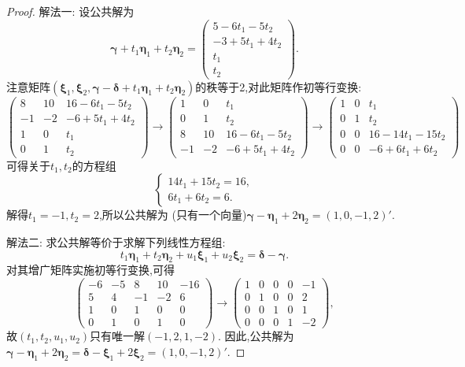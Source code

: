 \documentclass[../../main.tex]{subfiles}
\begin{document}
\begin{proof}
{\color{blue}解法一:} 设公共解为
\[
\boldsymbol{\gamma}+t_1\boldsymbol{\eta}_1 + t_2\boldsymbol{\eta}_2=\begin{pmatrix}
5 - 6t_1 - 5t_2\\
-3 + 5t_1 + 4t_2\\
t_1\\
t_2
\end{pmatrix}.
\]
注意矩阵\((\boldsymbol{\xi}_1,\boldsymbol{\xi}_2,\boldsymbol{\gamma}-\boldsymbol{\delta}+t_1\boldsymbol{\eta}_1 + t_2\boldsymbol{\eta}_2)\)的秩等于2,对此矩阵作初等行变换:
\[
\begin{pmatrix}
8&10&16 - 6t_1 - 5t_2\\
-1&-2&-6 + 5t_1 + 4t_2\\
1&0&t_1\\
0&1&t_2
\end{pmatrix}\to\begin{pmatrix}
1&0&t_1\\
0&1&t_2\\
8&10&16 - 6t_1 - 5t_2\\
-1&-2&-6 + 5t_1 + 4t_2
\end{pmatrix}\to
\begin{pmatrix}
1&0&t_1\\
0&1&t_2\\
0&0&16 - 14t_1 - 15t_2\\
0&0&-6 + 6t_1 + 6t_2
\end{pmatrix}
\]
可得关于\(t_1,t_2\)的方程组
\[
\begin{cases}
14t_1 + 15t_2 = 16,\\
6t_1 + 6t_2 = 6.
\end{cases}
\]
解得\(t_1=-1,t_2 = 2\),所以公共解为 (只有一个向量)\(\boldsymbol{\gamma}-\boldsymbol{\eta}_1 + 2\boldsymbol{\eta}_2=(1,0,-1,2)'\).

{\color{blue}解法二:} 求公共解等价于求解下列线性方程组:
\[
t_1\boldsymbol{\eta}_1 + t_2\boldsymbol{\eta}_2 + u_1\boldsymbol{\xi}_1 + u_2\boldsymbol{\xi}_2=\boldsymbol{\delta}-\boldsymbol{\gamma}.
\]
对其增广矩阵实施初等行变换,可得
\[
\begin{pmatrix}
-6&-5&8&10&-16\\
5&4&-1&-2&6\\
1&0&1&0&0\\
0&1&0&1&0
\end{pmatrix}\to\begin{pmatrix}
1&0&0&0&-1\\
0&1&0&0&2\\
0&0&1&0&1\\
0&0&0&1&-2
\end{pmatrix},
\]
故\((t_1,t_2,u_1,u_2)\)只有唯一解\((-1,2,1,-2)\). 因此,公共解为\(\boldsymbol{\gamma}-\boldsymbol{\eta}_1 + 2\boldsymbol{\eta}_2=\boldsymbol{\delta}-\boldsymbol{\xi}_1 + 2\boldsymbol{\xi}_2=(1,0,-1,2)'\).
\end{proof}
\end{document}
